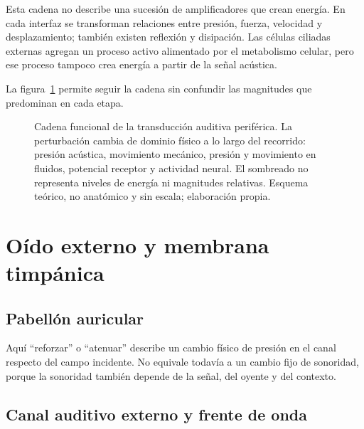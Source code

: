 Esta cadena no describe una sucesión de amplificadores que crean energía. En
cada interfaz se transforman relaciones entre presión, fuerza, velocidad y
desplazamiento; también existen reflexión y disipación. Las células ciliadas
externas agregan un proceso activo alimentado por el metabolismo celular, pero
ese proceso tampoco crea energía a partir de la señal acústica.

La figura~\ref{fig:sistema_auditivo} permite seguir la cadena sin confundir
las magnitudes que predominan en cada etapa.

\begin{figure}[htbp]
    \centering
    
    \caption{Cadena funcional de la transducción auditiva periférica. La
    perturbación cambia de dominio físico a lo largo del recorrido: presión
    acústica, movimiento mecánico, presión y movimiento en fluidos, potencial
    receptor y actividad neural. El sombreado no representa niveles de energía
    ni magnitudes relativas. Esquema teórico, no anatómico y sin escala;
    elaboración propia.}
    \label{fig:sistema_auditivo}
\end{figure}

\section{Oído externo y membrana timpánica}
\label{sec:u6-oido-externo}

\subsection{Pabellón auricular}
\label{sec:u6-pabellon}

Aquí ``reforzar'' o ``atenuar'' describe un cambio físico de presión en el
canal respecto del campo incidente. No equivale todavía a un cambio fijo de
sonoridad, porque la sonoridad también depende de la señal, del oyente y del
contexto.

\subsection{Canal auditivo externo y frente de onda}
\label{sec:u6-cae}

